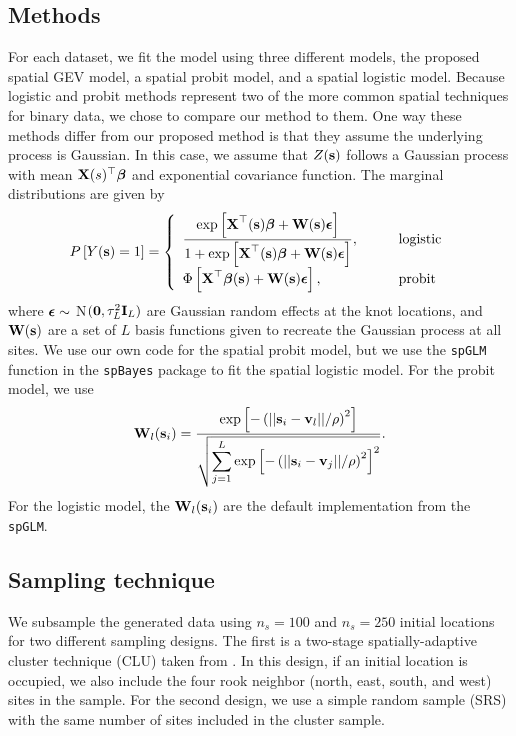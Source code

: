 \documentclass[11pt]{article}
\begin{document}
\subsection{Methods} \label{rbs:methods}
For each dataset, we fit the model using three different models, the proposed spatial GEV model, a spatial probit model, and a spatial logistic model.
Because logistic and probit methods represent two of the more common spatial techniques for binary data, we chose to compare our method to them.
One way these methods differ from our proposed method is that they assume the underlying process is Gaussian.
In this case, we assume that $Z(\mbox{\bf s})$ follows a Gaussian process with mean $\mbox{\bf X}(s)^\top \mbox{\boldmath $\beta$}$ and exponential covariance function.
The marginal distributions are given by
\begin{align}
  P\left[Y(\mbox{\bf s}) = 1\right] = \left\{ \begin{array}{ll}
    \displaystyle \frac{\exp\left[\mbox{\bf X}^\top(\mbox{\bf s}) \mbox{\boldmath $\beta$} + \mbox{\bf W} (\mbox{\bf s}) \mbox{\boldmath $\epsilon$} \right]}{1 + \exp\left[\mbox{\bf X}^\top(\mbox{\bf s}) \mbox{\boldmath $\beta$} + \mbox{\bf W} (\mbox{\bf s}) \mbox{\boldmath $\epsilon$} \right]}, \qquad &\text{logistic}\\
    \Phi\left[\mbox{\bf X}^\top \mbox{\boldmath $\beta$} (\mbox{\bf s}) + \mbox{\bf W} (\mbox{\bf s}) \mbox{\boldmath $\epsilon$} \right], \qquad &\text{probit}
  \end{array}\right.
\end{align}
where $\mbox{\boldmath $\epsilon$} \sim$ N$(\mbox{\boldmath $0$}, \tau^2_L \mbox{\bf I}_L)$ are Gaussian random effects at the knot locations, and $\mbox{\bf W}(\mbox{\bf s})$ are a set of $L$ basis functions given to recreate the Gaussian process at all sites.
We use our own code for the spatial probit model, but we use the \texttt{spGLM} function in the \texttt{spBayes} package \citep{Finley2015} to fit the spatial logistic model.
For the probit model, we use
\begin{align}
  \mbox{\bf W}_l(\mbox{\bf s}_i) = \frac{\exp\left[-\left(||\mbox{\bf s}_i-\mbox{\bf v}_l||/\rho\right)^2\right]}
                 {\sqrt{\displaystyle \sum_{j=1}^L\exp\left[-\left(||\mbox{\bf s}_i-\mbox{\bf v}_j||/\rho\right)^2\right]^2}}.
\end{align}
For the logistic model, the $\mbox{\bf W}_l(\mbox{\bf s}_i)$ are the default implementation from the \texttt{spGLM}.

\subsection{Sampling technique} \label{rbs:simsampling}
We subsample the generated data using $n_s = 100$ and $n_s = 250$ initial locations for two different sampling designs.
The first is a two-stage spatially-adaptive cluster technique (CLU) taken from \citet{Pacifici2016}.
In this design, if an initial location is occupied, we also include the four rook neighbor (north, east, south, and west) sites in the sample.
For the second design, we use a simple random sample (SRS) with the same number of sites included in the cluster sample.
\end{document}
